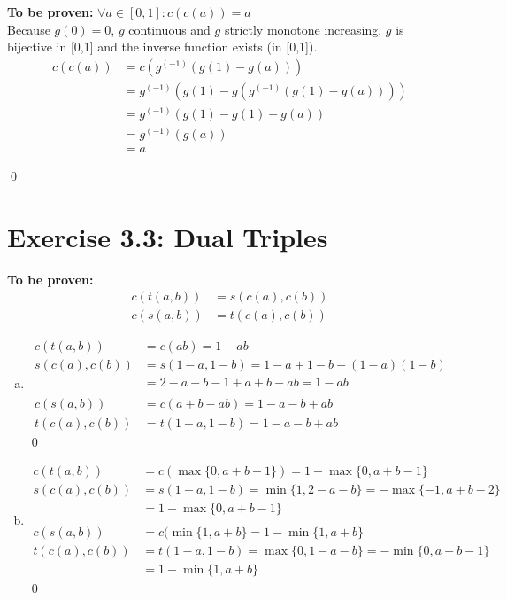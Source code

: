 \documentclass[a4paper]{scrartcl}
\begin{document}
\textbf{To be proven:} $\forall a \in [0,1]: c(c(a)) = a$ \\
Because $g(0) = 0$, $g$ continuous and $g$ strictly monotone increasing, $g$ is bijective in [0,1] and the inverse function exists (in [0,1]).
\begin{align*}
        c(c(a)) &= c \left( g^{(-1)} \left( g(1) - g(a) \right) \right) \\
                &= g^{(-1)} \left( g(1) - g \left( g^{(-1)} \left( g(1) - g(a) \right) \right) \right) \\
                &= g^{(-1)} \left( g(1)-g(1)+g(a) \right) \\
                &= g^{(-1)} \left( g(a) \right) \\
                &= a 
\end{align*}
    
\qed

\section{Exercise 3.3: Dual Triples}
\textbf{To be proven:}
\begin{align*}
c\left( t(a, b) \right) &= s\left( c(a), c(b) \right) \\
c\left( s(a, b) \right) &= t\left( c(a), c(b) \right)
\end{align*}
\begin{enumerate}[a)]
\item 
    \begin{align*}
    c(t(a,b)) &= c(ab) = 1-ab \\
    s(c(a),c(b)) &= s(1-a,1-b) = 1-a +1 -b - (1-a) (1-b)\\
    &= 2 - a -b - 1 +a +b -ab  = 1-ab \\
    \\
    c(s(a,b)) &= c(a+b-ab) = 1 -a -b + ab \\
    t(c(a),c(b)) &= t(1-a,1-b) = 1-a-b+ab
    \end{align*}
    \qed
\item 
\begin{align*}
c(t(a,b)) &= c(\max\{0,a+b-1\}) = 1-\max\{0,a+b-1\} \\
s(c(a),c(b)) &= s(1-a,1-b) = \min \{1,2-a-b\} = - \max \{-1, a+b-2\} \\
&=  1-\max\{0,a+b-1\}\\
\\
 c(s(a,b)) &= c(\min \{1,a+b\} = 1 - \min \{ 1, a+b\} \\
 t(c(a),c(b)) &= t(1-a,1-b) = \max \{ 0, 1 - a -b\} = - \min \{ 0, a+b-1 \} \\ 
 &= 1 - \min\{1,a+b\}
\end{align*}
\qed

\end{enumerate}
\end{document}

